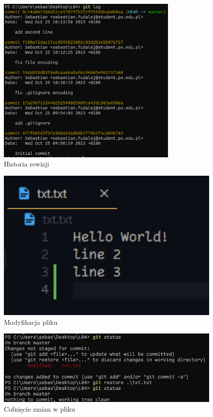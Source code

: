 \documentclass{article} %
\begin{document}
\begin{figure}[h]
	\centering
	\includegraphics[width=0.8\textwidth]{image/git/10.png}
	\caption{Historia rewizji}
\end{figure}

\begin{figure}[h]
	\centering
	\includegraphics[width=1\textwidth]{image/git/11.png}
	\caption{Modyfikacja pliku}
\end{figure}

\begin{figure}[h]
	\centering
	\includegraphics[width=1\textwidth]{image/git/12.png}
	\caption{Cofnięcie zmian w pliku}
\end{figure}
\end{document}

